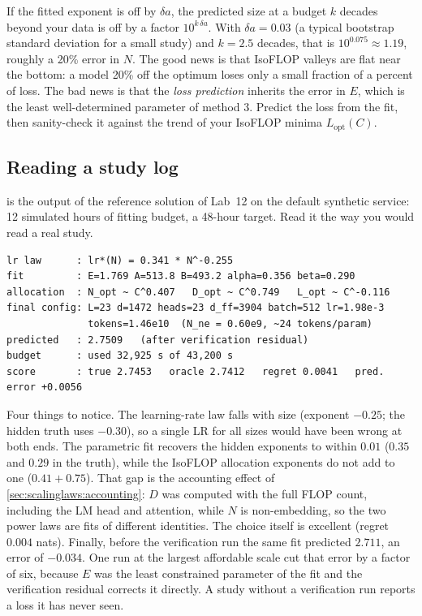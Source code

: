 \begin{napkinmath}
If the fitted exponent is off by $\delta a$, the predicted size at a budget $k$ decades beyond
your data is off by a factor $10^{k\,\delta a}$. With $\delta a=0.03$ (a typical bootstrap
standard deviation for a small study) and $k=2.5$ decades, that is $10^{0.075}\approx1.19$,
roughly a 20\% error in $N$. The good news is that IsoFLOP valleys are flat near the bottom: a model
20\% off the optimum loses only a small fraction of a percent of loss. The bad news is that the
\emph{loss prediction} inherits the error in $E$, which is the least well-determined parameter of
method 3. Predict the loss from the fit, then sanity-check it against the trend of your IsoFLOP minima
$L_{\text{opt}}(C)$.
\end{napkinmath}

\subsection{Reading a study log}\label{sec:scalinglaws:log}

 is the output of the reference solution of Lab~12 on the default
synthetic service: 12 simulated hours of fitting budget, a 48-hour target. Read it the way you
would read a real study.

\begin{lstlisting}[style=plain, caption={Output of \code{run.py study} (synthetic service, seed 0; numbers abridged).},label={lst:scalinglaws:log}]
lr law      : lr*(N) = 0.341 * N^-0.255
fit         : E=1.769 A=513.8 B=493.2 alpha=0.356 beta=0.290
allocation  : N_opt ~ C^0.407   D_opt ~ C^0.749   L_opt ~ C^-0.116
final config: L=23 d=1472 heads=23 d_ff=3904 batch=512 lr=1.98e-3
              tokens=1.46e10  (N_ne = 0.60e9, ~24 tokens/param)
predicted   : 2.7509   (after verification residual)
budget      : used 32,925 s of 43,200 s
score       : true 2.7453   oracle 2.7412   regret 0.0041   pred. error +0.0056
\end{lstlisting}

Four things to notice. The learning-rate law falls with size (exponent $-0.25$; the hidden truth
uses $-0.30$), so a single LR for all sizes would have been wrong at both ends. The parametric fit
recovers the hidden exponents to within $0.01$ ($0.35$ and $0.29$ in the truth), while the
IsoFLOP allocation exponents do not add to one ($0.41+0.75$). That gap is the accounting effect
of \cref{sec:scalinglaws:accounting}: $D$ was computed with the full FLOP count, including the LM
head and attention, while $N$ is non-embedding, so the two power laws are fits of different
identities. The choice itself is excellent (regret $0.004$ nats). Finally, before the
verification run the same fit predicted $2.711$, an error of $-0.034$. One run at the largest
affordable scale cut that error by a factor of six, because $E$ was the least constrained
parameter of the fit and the verification residual corrects it directly. A study without a
verification run reports a loss it has never seen.

